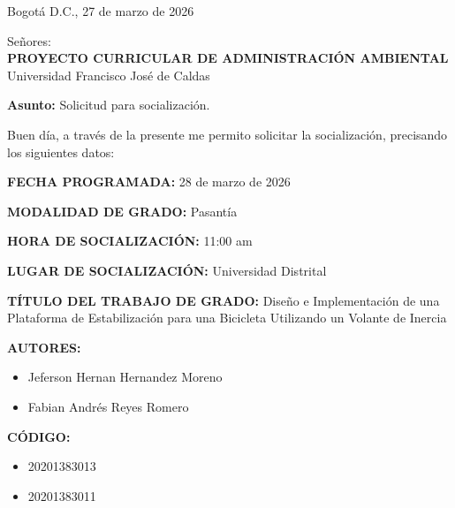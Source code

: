 \documentclass[12pt,letterpaper]{article}
\begin{document}
\singlespacing

\noindent
Bogotá D.C., 27 de marzo de 2026

\vspace{0.3cm}

\noindent
Señores:\\
\textbf{PROYECTO CURRICULAR DE ADMINISTRACIÓN AMBIENTAL}\\
Universidad Francisco José de Caldas

\vspace{0.3cm}

\noindent
\textbf{Asunto:} Solicitud para socialización.

\vspace{0.3cm}

\noindent
Buen día, a través de la presente me permito solicitar la socialización, precisando los siguientes datos:

\vspace{0.2cm}

\noindent
\textbf{FECHA PROGRAMADA:} 28 de marzo de 2026

\vspace{0.1cm}

\noindent
\textbf{MODALIDAD DE GRADO:} Pasantía

\vspace{0.1cm}

\noindent
\textbf{HORA DE SOCIALIZACIÓN:} 11:00 am

\vspace{0.1cm}

\noindent
\textbf{LUGAR DE SOCIALIZACIÓN:} Universidad Distrital

\vspace{0.1cm}

\noindent
\textbf{TÍTULO DEL TRABAJO DE GRADO:} Diseño e Implementación de una Plataforma de Estabilización para una Bicicleta Utilizando un Volante de Inercia

\vspace{0.1cm}

\noindent
\textbf{AUTORES:}
\begin{itemize}
    \setlength\itemsep{-0.3em}
    \item Jeferson Hernan Hernandez Moreno
    \item Fabian Andrés Reyes Romero
\end{itemize}

\vspace{0.1cm}

\noindent
\textbf{CÓDIGO:}
\begin{itemize}
    \setlength\itemsep{-0.3em}
    \item 20201383013
    \item 20201383011
\end{itemize}
\end{document}
